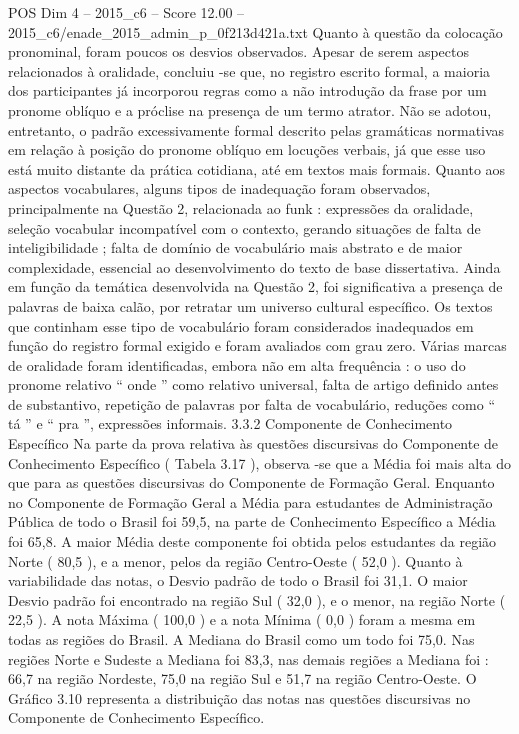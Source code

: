 \begin{textsample}{POS Dim 4 – 2015\_c6 – Score 12.00 – 2015\_c6/enade\_2015\_admin\_p\_0f213d421a.txt}
Quanto à questão da colocação pronominal, foram poucos os desvios observados.
Apesar de serem aspectos relacionados à oralidade, concluiu -se que, no registro escrito formal, a maioria dos participantes já incorporou regras como a não introdução da frase por um pronome oblíquo e a próclise na presença de um termo atrator.
Não se adotou, entretanto, o padrão excessivamente formal descrito pelas gramáticas normativas em relação à posição do pronome oblíquo em locuções verbais, já que esse uso está muito distante da prática cotidiana, até em textos mais formais.
Quanto aos aspectos vocabulares, alguns tipos de inadequação foram observados, principalmente na Questão 2, relacionada ao funk : expressões da oralidade, seleção vocabular incompatível com o contexto, gerando situações de falta de inteligibilidade ; falta de domínio de vocabulário mais abstrato e de maior complexidade, essencial ao desenvolvimento do texto de base dissertativa.
Ainda em função da temática desenvolvida na Questão 2, foi significativa a presença de palavras de baixa calão, por retratar um universo cultural específico.
Os textos que continham esse tipo de vocabulário foram considerados inadequados em função do registro formal exigido e foram avaliados com grau zero.
Várias marcas de oralidade foram identificadas, embora não em alta frequência : o uso do pronome relativo “ onde ” como relativo universal, falta de artigo definido antes de substantivo, repetição de palavras por falta de vocabulário, reduções como “ tá ” e “ pra ”, expressões informais. 3.3.2 Componente de Conhecimento Específico Na parte da prova relativa às questões discursivas do Componente de Conhecimento Específico ( Tabela 3.17 ), observa -se que a Média foi mais alta do que para as questões discursivas do Componente de Formação Geral.
Enquanto no Componente de Formação Geral a Média para estudantes de Administração Pública de todo o Brasil foi 59,5, na parte de Conhecimento Específico a Média foi 65,8.
A maior Média deste componente foi obtida pelos estudantes da região Norte ( 80,5 ), e a menor, pelos da região Centro-Oeste ( 52,0 ).
Quanto à variabilidade das notas, o Desvio padrão de todo o Brasil foi 31,1.
O maior Desvio padrão foi encontrado na região Sul ( 32,0 ), e o menor, na região Norte ( 22,5 ).
A nota Máxima ( 100,0 ) e a nota Mínima ( 0,0 ) foram a mesma em todas as regiões do Brasil.
A Mediana do Brasil como um todo foi 75,0.
Nas regiões Norte e Sudeste a Mediana foi 83,3, nas demais regiões a Mediana foi : 66,7 na região Nordeste, 75,0 na região Sul e 51,7 na região Centro-Oeste.
O Gráfico 3.10 representa a distribuição das notas nas questões discursivas no Componente de Conhecimento Específico.

\end{textsample}
